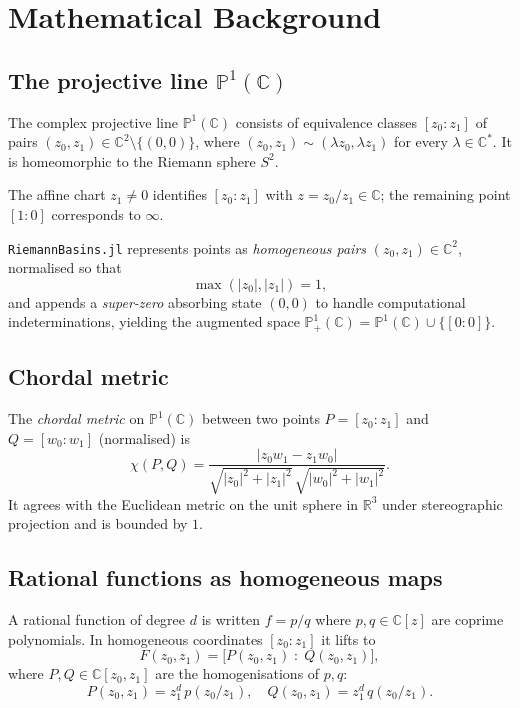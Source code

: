 \documentclass[11pt,a4paper]{article}
\theoremstyle{definition}
\newcommand{\C}{\mathbb{C}}
\newcommand{\R}{\mathbb{R}}
\newcommand{\Pone}{\mathbb{P}^1(\C)}
\newcommand{\Ptwo}{\mathbb{P}^1_+(\C)}
\newcommand{\pkg}[1]{\texttt{#1}}
\begin{document}
\section{Mathematical Background}

\subsection{The projective line $\Pone$}

The complex projective line $\Pone$ consists of equivalence classes
$[z_0 : z_1]$ of pairs $(z_0, z_1) \in \C^2 \setminus \{(0,0)\}$, where
$(z_0,z_1)\sim(\lambda z_0,\lambda z_1)$ for every $\lambda\in\C^*$.
It is homeomorphic to the Riemann sphere $S^2$.

The affine chart $z_1\ne 0$ identifies $[z_0:z_1]$ with $z = z_0/z_1\in\C$;
the remaining point $[1:0]$ corresponds to $\infty$.

\pkg{RiemannBasins.jl} represents points as \emph{homogeneous pairs}
$(z_0,z_1)\in\C^2$, normalised so that
\[
  \max(|z_0|,|z_1|) = 1,
\]
and appends a \emph{super-zero} absorbing state $(0,0)$ to handle
computational indeterminations, yielding the augmented space
$\Ptwo = \Pone \cup \{[0:0]\}$.

\subsection{Chordal metric}

The \emph{chordal metric} on $\Pone$ between two points
$P=[z_0:z_1]$ and $Q=[w_0:w_1]$ (normalised) is
\[
  \chi(P,Q)
  = \frac{|z_0 w_1 - z_1 w_0|}%
         {\sqrt{|z_0|^2+|z_1|^2}\,\sqrt{|w_0|^2+|w_1|^2}}.
\]
It agrees with the Euclidean metric on the unit sphere in $\R^3$ under
stereographic projection and is bounded by $1$.

\subsection{Rational functions as homogeneous maps}

A rational function of degree $d$ is written $f = p/q$ where
$p,q\in\C[z]$ are coprime polynomials.
In homogeneous coordinates $[z_0:z_1]$ it lifts to
\[
  F(z_0,z_1) = \bigl[P(z_0,z_1)\;:\;Q(z_0,z_1)\bigr],
\]
where $P,Q\in\C[z_0,z_1]$ are the homogenisations of $p,q$:
\[
  P(z_0,z_1) = z_1^d\,p(z_0/z_1),\quad
  Q(z_0,z_1) = z_1^d\,q(z_0/z_1).
\]
\end{document}
